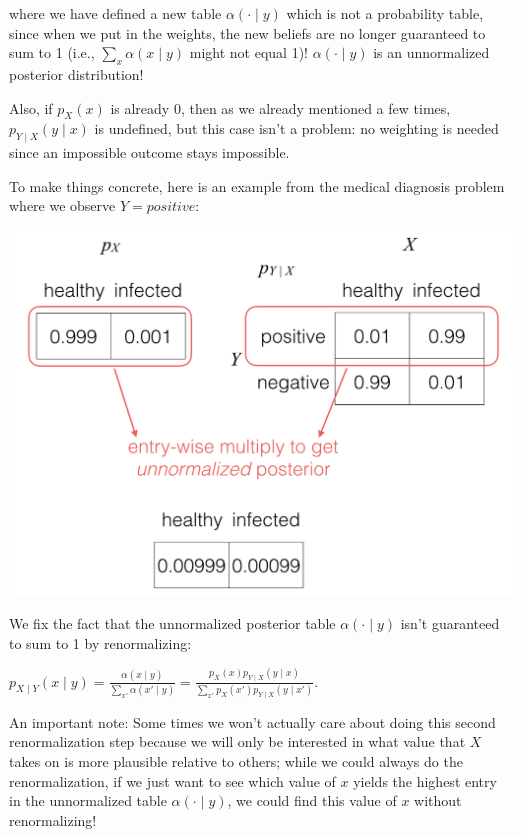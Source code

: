 \documentclass[6008notes.tex]{subfiles}
\begin{document}
where we have defined a new table $\alpha (\cdot \mid y)$ which is not a probability table, since when we put in the weights, the new beliefs are no longer guaranteed to sum to 1 (i.e., $\sum _{x}\alpha (x\mid y)$ might not equal 1)! $\alpha (\cdot \mid y)$ is an unnormalized posterior distribution!

Also, if $p_X(x)$ is already 0, then as we already mentioned a few times, $p_{Y\mid X}(y\mid x)$ is undefined, but this case isn't a problem: no weighting is needed since an impossible outcome stays impossible.

To make things concrete, here is an example from the medical diagnosis problem where we observe $Y=positive$:

{\centering\includegraphics[scale=0.3]{images_sec-bayes-computational-view} \par}

We fix the fact that the unnormalized posterior table $\alpha (\cdot \mid y)$ isn't guaranteed to sum to 1 by renormalizing:

{\centering$p_{X\mid Y}(x\mid y)=\frac{\alpha (x\mid y)}{\sum _{ x'}\alpha ( x'\mid y)}=\frac{p_{X}(x)p_{Y\mid X}(y\mid x)}{\sum _{ x'}p_{X}( x')p_{Y\mid X}(y\mid x')}.$ \par}
 
An important note: Some times we won't actually care about doing this second renormalization step because we will only be interested in what value that $X$ takes on is more plausible relative to others; while we could always do the renormalization, if we just want to see which value of $x$ yields the highest entry in the unnormalized table $\alpha (\cdot \mid y)$, we could find this value of $x$ without renormalizing!
\end{document}
